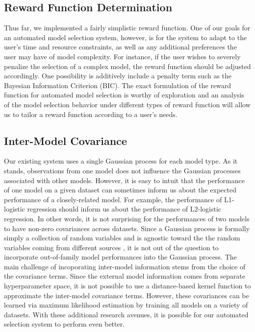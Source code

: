 \documentclass{article}
\begin{document}
\subsection{Reward Function Determination}
Thus far, we implemented a fairly simplistic reward function. One of our goals for an automated model selection system, however, is for the system to adapt to the user's time and resource constraints, as well as any additional preferences the user may have of model complexity. For instance, if the user wishes to severely penalize the selection of a complex model, the reward function should be adjusted accordingly. One possibility is additively include a penalty term such as the Bayesian Information Criterion (BIC). The exact formulation of the reward function for automated model selection is worthy of exploration and an analysis of the model selection behavior under different types of reward function will allow us to tailor a reward function according to a user's needs.

\subsection{Inter-Model Covariance}
Our existing system uses a single Gaussian process for each model type. As it stands, observations from one model does not influence the Gaussian processes associated with other models. However, it is easy to intuit that the performance of one model on a given dataset can sometimes inform us about the expected performance of a closely-related model. For example, the performance of L1-logistic regression should inform us about the performance of L2-logistic regression. In other words, it is not surprising for the performances of two models to have non-zero covariances across datasets. Since a Gaussian process is formally simply a collection of random variables and is agnostic toward the the random variables coming from different sources \cite{rasmussen:book}, it is not out of the question to incorporate out-of-family model performances into the Gaussian process. The main challenge of incoporating inter-model information stems from the choice of the covariance terms. Since the external model information comes from separate hyperparameter space, it is not possible to use a distance-based kernel function to approximate the inter-model covariance terms. However, these covariances can be learned via maximum likelihood estimation by training all models on a variety of datasets. With these additional research avenues, it is possible for our automated selection system to perform even better.


\end{document}
